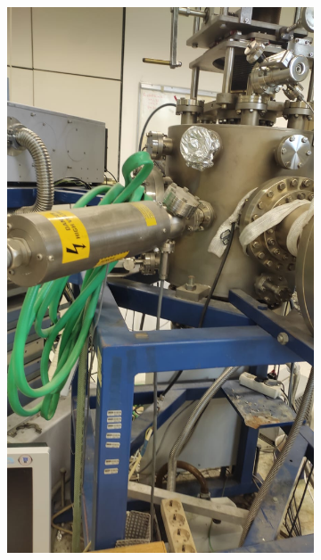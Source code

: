 \begin{figure}[H]
    \centering
    \begin{subfigure}[b]{0.3\textwidth}
        \centering
        \includegraphics[width=1\textwidth]{sections/imges/vacuum_vessel/Halterung1.jpeg}
        \label{fig:Halterung1}
    \end{subfigure}
    \begin{subfigure}[b]{0.3\textwidth}

\end{subfigure}
\end{figure}
